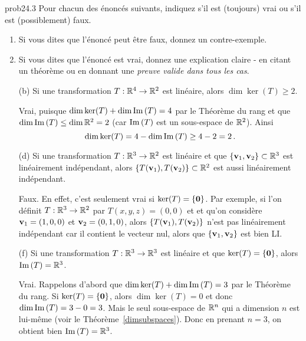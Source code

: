\bigskip
\begin{sol}{prob24.3} Pour chacun des énoncés suivants, indiquez s'il est (toujours) vrai ou s'il est (possiblement) faux.   
   \smallskip    
\begin{enumerate}[$\bullet$]
\item Si vous dites que l'\'enonc\'e peut être faux, donnez un contre-exemple.   
\item Si vous dites que l'\'enonc\'e est vrai, donnez une explication claire - en citant un théorème ou en donnant une {\it preuve valide dans tous les cas}. 
\end{enumerate}

\medskip
\begin{enumerate}[]
 

\item[(b)] Si une transformation $T:\mathbb{R}^4 \to \mathbb{R}^2$ est lin\'eaire, alors $\dim \ker(T) \ge 2$.


\soln Vrai, puisque $\dim \ker(T) + \dim \operatorname{Im}\,(T) =4$ par le Théorème du rang et que $\dim \operatorname{Im}\,(T) \le \dim \mathbb{R}^2 =2$ (car $\operatorname{Im}\,(T)$ est un sous-espace de $\mathbb{R}^2$). Ainsi 
$$\dim \ker(T) =4- \dim \operatorname{Im}\,(T) \ge 4-2 =2\,.$$
 

 
\item [(d)] Si une transformation $T:\mathbb{R}^3 \to \mathbb{R}^2$ est lin\'eaire et que $\{\mathbf{v}_1,\mathbf{v}_2\} \subset \mathbb{R}^3$ est lin\'eairement ind\'ependant, alors $\{T(\mathbf{v}_1),T(\mathbf{v}_2)\} \subset \mathbb{R}^2$ est aussi lin\'eairement ind\'ependant.

\soln Faux. En effet, c'est seulement vrai si $\ker(T)=\{\mathbf{0}\}$. Par exemple, si l'on définit $T:\mathbb{R}^3 \to \mathbb{R}^2$ par $T(x,y,z)=(0,0)$ et et qu'on considère $\mathbf{v}_1=(1,0,0)$ et $\mathbf{v}_2=(0,1,0)$, alors $\{T(\mathbf{v}_1), T(\mathbf{v}_2)\}$ n'est pas lin\'eairement indépendant car il contient le vecteur nul, alors que $\{\mathbf{v}_1, \mathbf{v}_2\}$ est bien LI.
\medskip



\item [(f)] Si une transformation $T:\mathbb{R}^3 \to \mathbb{R}^3$ est lin\'eaire et que $\ker(T)=\{\mathbf{0}\}$, alors $\operatorname{Im}\,(T)=\mathbb{R}^3$.

\soln Vrai. Rappelons d'abord que $\dim \ker(T) + \dim \operatorname{Im}\,(T) =3$ par le Théorème du rang. Si $\ker(T)=\{\mathbf{0}\}$, alors $\dim \ker(T)=0$ et donc $\dim \operatorname{Im}\,(T) =3-0=3$. Mais le seul sous-espace de $\mathbb{R}^n$ qui a dimension $n$ est lui-même (voir le Th\'eor\`eme~\ref{dimsubspaces}). Donc en prenant $n=3$, on obtient bien $\operatorname{Im}\,(T)= \mathbb{R}^3$.
\medskip

\end{enumerate}

\end{sol}

